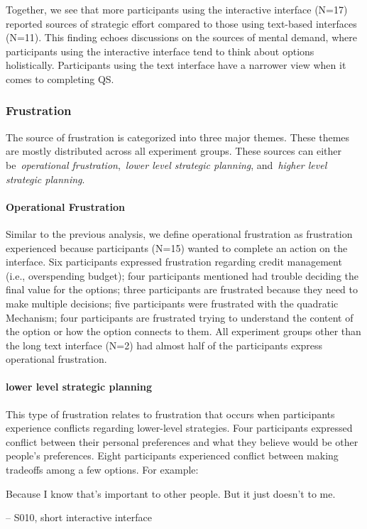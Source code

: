 Together, we see that more participants using the interactive interface (N=17) reported sources of strategic effort compared to those using text-based interfaces (N=11). This finding echoes discussions on the sources of mental demand, where participants using the interactive interface tend to think about options holistically. Participants using the text interface have a narrower view when it comes to completing QS.
    

\subsubsection{Frustration}
The source of frustration is categorized into three major themes. These themes are mostly distributed across all experiment groups. These sources can either be~\textit{operational frustration},~\textit{lower level strategic planning}, and~\textit{higher level strategic planning}.

\paragraph{Operational Frustration} Similar to the previous analysis, we define operational frustration as frustration experienced because participants (N=15) wanted to complete an action on the interface. Six participants expressed frustration regarding credit management (i.e., overspending budget); four participants mentioned had trouble deciding the final value for the options; three participants are frustrated because they need to make multiple decisions; five participants were frustrated with the quadratic Mechanism; four participants are frustrated trying to understand the content of the option or how the option connects to them. All experiment groups other than the long text interface (N=2) had almost half of the participants express operational frustration.

\paragraph{lower level strategic planning} This type of frustration relates to frustration that occurs when participants experience conflicts regarding lower-level strategies. Four participants expressed conflict between their personal preferences and what they believe would be other people's preferences. Eight participants experienced conflict between making tradeoffs among a few options. For example:

\begin{displayquote}
Because I know that's important to other people. But it just doesn't to me.
    
\noindent \hfill -- S010, short interactive interface
\end{displayquote}

